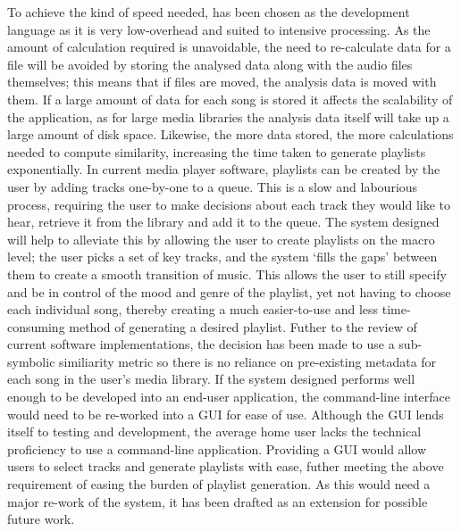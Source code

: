 {To achieve the kind of speed needed,  has been chosen as the development language as it is very low-overhead and suited to intensive processing. As the amount of calculation required is unavoidable, the need to re-calculate data for a file will be avoided by storing the analysed data along with the audio files themselves; this means that if files are moved, the analysis data is moved with them.
\label{text:spec:requirement:data}
If a large amount of data for each song is stored it affects the scalability of the application, as for large media libraries the analysis data itself will take up a large amount of disk space. Likewise, the more data stored, the more calculations needed to compute similarity, increasing the time taken to generate playlists exponentially.
In current media player software, playlists can be created by the user by adding tracks one-by-one to a queue. This is a slow and labourious process, requiring the user to make decisions about each track they would like to hear, retrieve it from the library and add it to the queue. The system designed will help to alleviate this by allowing the user to create playlists on the macro level; the user picks a set of key tracks, and the system `fills the gaps' between them to create a smooth transition of music. This allows the user to still specify and be in control of the mood and genre of the playlist, yet not having to choose each individual song, thereby creating a much easier-to-use and less time-consuming method of generating a desired playlist.
Futher to the review of current software implementations, the decision has been made to use a sub-symbolic similiarity metric so there is no reliance on pre-existing metadata for each song in the user's media library.
If the system designed performs well enough to be developed into an end-user application, the command-line interface would need to be re-worked into a GUI for ease of use. Although the GUI lends itself to testing and development, the average home user lacks the technical proficiency to use a command-line application. Providing a GUI would allow users to select tracks and generate playlists with ease, futher meeting the above requirement of easing the burden of playlist generation. As this would need a major re-work of the system, it has been drafted as an extension for possible future work.
}
